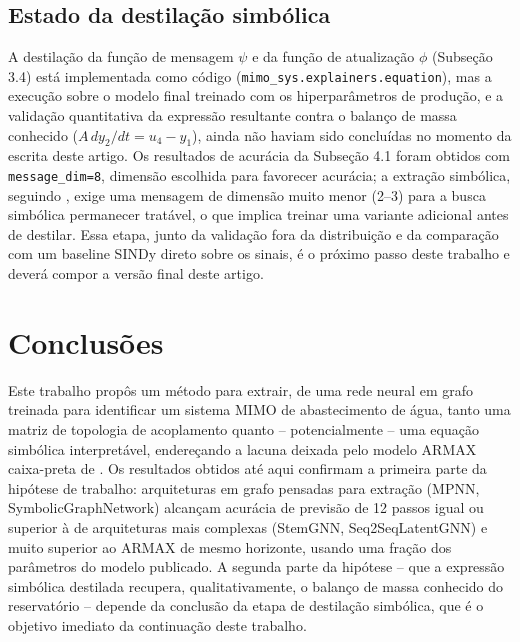 \documentclass[
	article,		%
	12pt,			%
	oneside,
	a4paper,
	brazil
]{abntex2}
\begin{document}
\subsection{Estado da destilação simbólica}

A destilação da função de mensagem $\psi$ e da função de atualização
$\phi$ (Subseção 3.4) está implementada como código
(\texttt{mimo\_sys.explainers.equation}), mas a execução sobre o modelo
final treinado com os hiperparâmetros de produção, e a validação
quantitativa da expressão resultante contra o balanço de massa conhecido
($A\, dy_2/dt = u_4 - y_1$), ainda não haviam sido concluídas no momento da
escrita deste artigo. Os resultados de acurácia da Subseção 4.1 foram
obtidos com \texttt{message\_dim=8}, dimensão escolhida para favorecer
acurácia; a extração simbólica, seguindo , exige
uma mensagem de dimensão muito menor (2--3) para a busca simbólica
permanecer tratável, o que implica treinar uma variante adicional antes de
destilar. Essa etapa, junto da validação fora da distribuição e da
comparação com um baseline SINDy direto sobre os sinais, é o próximo passo
deste trabalho e deverá compor a versão final deste artigo.

\section{Conclusões}

Este trabalho propôs um método para extrair, de uma rede neural em grafo
treinada para identificar um sistema MIMO de abastecimento de água, tanto
uma matriz de topologia de acoplamento quanto -- potencialmente -- uma
equação simbólica interpretável, endereçando a lacuna deixada pelo modelo
ARMAX caixa-preta de . Os resultados obtidos até
aqui confirmam a primeira parte da hipótese de trabalho: arquiteturas em
grafo pensadas para extração (MPNN, SymbolicGraphNetwork) alcançam
acurácia de previsão de 12 passos igual ou superior à de arquiteturas mais
complexas (StemGNN, Seq2SeqLatentGNN) e muito superior ao ARMAX de mesmo
horizonte, usando uma fração dos parâmetros do modelo publicado. A segunda
parte da hipótese -- que a expressão simbólica destilada recupera,
qualitativamente, o balanço de massa conhecido do reservatório -- depende
da conclusão da etapa de destilação simbólica, que é o objetivo imediato da
continuação deste trabalho.
\end{document}

